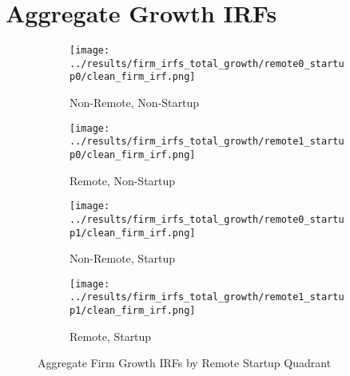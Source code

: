 \documentclass[11pt]{article}
\begin{document}
\section*{Aggregate Growth IRFs}
\begin{figure}[H]
  \centering
  \begin{subfigure}[t]{0.48\linewidth}
    \centering
    \texttt{[image: ../results/firm\_irfs\_total\_growth/remote0\_startup0/clean\_firm\_irf.png]}
    \caption{Non-Remote, Non-Startup}
  \end{subfigure}\hfill
  \begin{subfigure}[t]{0.48\linewidth}
    \centering
    \texttt{[image: ../results/firm\_irfs\_total\_growth/remote1\_startup0/clean\_firm\_irf.png]}
    \caption{Remote, Non-Startup}
  \end{subfigure}

  \begin{subfigure}[t]{0.48\linewidth}
    \centering
    \texttt{[image: ../results/firm\_irfs\_total\_growth/remote0\_startup1/clean\_firm\_irf.png]}
    \caption{Non-Remote, Startup}
  \end{subfigure}\hfill
  \begin{subfigure}[t]{0.48\linewidth}
    \centering
    \texttt{[image: ../results/firm\_irfs\_total\_growth/remote1\_startup1/clean\_firm\_irf.png]}
    \caption{Remote, Startup}
  \end{subfigure}
  \caption{Aggregate Firm Growth IRFs by Remote \texttimes{} Startup Quadrant}
\end{figure}
\end{document}
